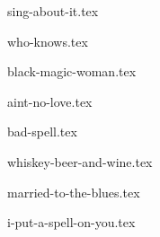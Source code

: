 \begin{songs}{}
  {sing-about-it.tex}
  \sclearpage
    
  {who-knows.tex}
  \sclearpage

  {black-magic-woman.tex}
  \sclearpage

  {aint-no-love.tex}
  \sclearpage
    
  {bad-spell.tex}
  \sclearpage
  
  {whiskey-beer-and-wine.tex}
  \sclearpage

  {married-to-the-blues.tex}
  \sclearpage

  {i-put-a-spell-on-you.tex}
  \sclearpage
    
 \end{songs}
